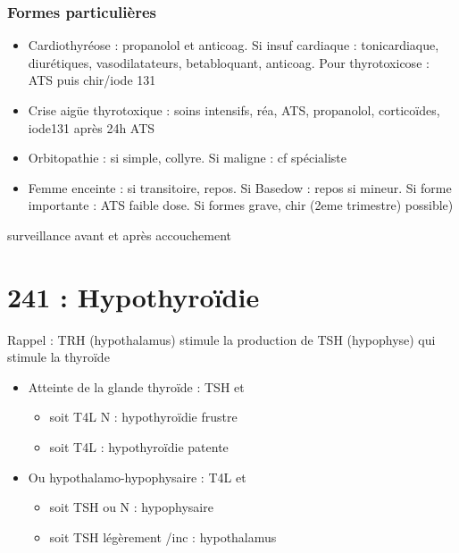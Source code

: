 \documentclass[11pt]{article}
\begin{document}
\subsubsection{Formes particulières}
\label{sec:org6b9d4a2}
\begin{itemize}
\item Cardiothyréose : propanolol et anticoag. Si insuf cardiaque : tonicardiaque,
diurétiques, vasodilatateurs, betabloquant, anticoag. Pour thyrotoxicose : ATS
puis chir/iode 131
\item Crise aigüe thyrotoxique : soins intensifs, réa, ATS, propanolol, corticoïdes,
iode131 après 24h ATS
\item Orbitopathie : si simple, collyre. Si maligne : cf spécialiste
\item Femme enceinte : si transitoire, repos. Si Basedow : repos si mineur. Si forme
importante : ATS faible dose. Si formes grave, chir (2eme trimestre) possible)
\end{itemize}
\thus surveillance avant et après accouchement  

\section{241 : Hypothyroïdie}
\label{sec:org4cff33e}
\begin{tcolorbox}
Rappel : TRH (hypothalamus) stimule la production de TSH (hypophyse) qui stimule la thyroïde
\end{tcolorbox}

\begin{itemize}
\item Atteinte de la glande thyroïde  : \inc TSH et 
\begin{itemize}
\item soit T4L N : hypothyroïdie frustre
\item soit T4L \dec : hypothyroïdie patente
\end{itemize}
\item Ou hypothalamo-hypophysaire : T4L \dec et 
\begin{itemize}
\item soit TSH \dec ou N : hypophysaire
\item soit TSH légèrement /inc : hypothalamus
\end{itemize}
\end{itemize}
\end{document}
